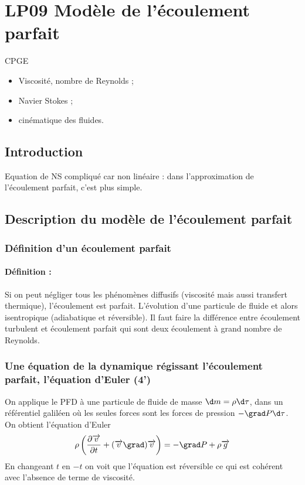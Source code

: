 \section{LP09 Modèle de l'écoulement parfait}

\niveau CPGE

\prerequis
\begin{itemize}
\item Viscosité, nombre de Reynolds ;
\item Navier Stokes ;
\item cinématique des fluides.
\end{itemize}

\objectif

\footnotesize{}
\bibentry{}

\subsection{Introduction}

Equation de NS compliqué car non linéaire : dans l'approximation de l'écoulement parfait, c'est plus simple.

\subsection{Description du modèle de l'écoulement parfait}
\subsubsection{Définition d'un écoulement parfait}

\paragraph{Définition :}
Si on peut négliger tous les phénomènes diffusifs (viscosité mais aussi transfert thermique), l'écoulement est parfait.
L'évolution d'une particule de fluide et alors isentropique (adiabatique et réversible).
Il faut faire la différence entre écoulement turbulent et écoulement parfait qui sont deux écoulement à grand nombre de Reynolds.

\subsubsection{Une équation de la dynamique régissant l'écoulement parfait, l'équation d'Euler (4')}

On applique le PFD à une particule de fluide de masse $\d m = \rho \d \tau$, dans un référentiel galiléen où les seules forces sont les forces de pression $-\grad P \d \tau$.
On obtient l'équation d'Euler
\begin{equation}
\rho \left(\frac{\partial \overrightarrow{v}}{\partial t} + (\overrightarrow{v}\grad) \overrightarrow{v} \right) = -\grad P + \rho \overrightarrow{g}
\end{equation}
En changeant $t$ en $-t$ on voit que l'équation est réversible ce qui est cohérent avec l'absence de terme de viscosité.

